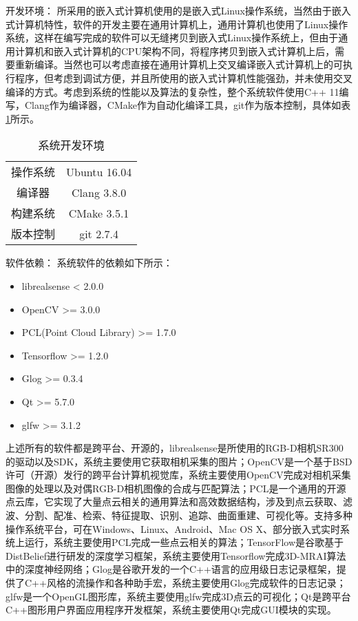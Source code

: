{\kai 开发环境：}
所采用的嵌入式计算机使用的是嵌入式Linux操作系统，当然由于嵌入式计算机特性，软件的开发主要在通用计算机上，通用计算机也使用了Linux操作系统，这样在编写完成的软件可以无缝拷贝到嵌入式Linux操作系统上，但由于通用计算机和嵌入式计算机的CPU架构不同，将程序拷贝到嵌入式计算机上后，需要重新编译。当然也可以考虑直接在通用计算机上交叉编译嵌入式计算机上的可执行程序，但考虑到调试方便，并且所使用的嵌入式计算机性能强劲，并未使用交叉编译的方式。考虑到系统的性能以及算法的复杂性，整个系统软件使用C++ 11编写，Clang作为编译器，CMake作为自动化编译工具，git作为版本控制，具体如表\ref{tab:dev_env}所示。
\begin{table}[ht]
  \centering
  \caption{系统开发环境}
  \begin{tabular}{cc}
    \toprule
    操作系统&Ubuntu 16.04\\
    编译器&Clang 3.8.0 \\
    构建系统&CMake 3.5.1 \\
    版本控制& git 2.7.4 \\
    \bottomrule
  \end{tabular}
  \label{tab:dev_env}
\end{table}

{\kai 软件依赖：}
系统软件的依赖如下所示：
\begin{itemize}
\item librealsense < 2.0.0
\item OpenCV >= 3.0.0
\item PCL(Point Cloud Library) >= 1.7.0
\item Tensorflow >= 1.2.0
\item Glog >= 0.3.4
\item Qt >= 5.7.0
\item glfw >= 3.1.2
\end{itemize}
上述所有的软件都是跨平台、开源的，librealsense是所使用的RGB-D相机SR300的驱动以及SDK，系统主要使用它获取相机采集的图片；OpenCV是一个基于BSD许可（开源）发行的跨平台计算机视觉库，系统主要使用OpenCV完成对相机采集图像的处理以及对偶RGB-D相机图像的合成与匹配算法；PCL是一个通用的开源点云库，它实现了大量点云相关的通用算法和高效数据结构，涉及到点云获取、滤波、分割、配准、检索、特征提取、识别、追踪、曲面重建、可视化等。支持多种操作系统平台，可在Windows、Linux、Android、Mac OS X、部分嵌入式实时系统上运行，系统主要使用PCL完成一些点云相关的算法；TensorFlow是谷歌基于DistBelief进行研发的深度学习框架，系统主要使用Tensorflow完成3D-MRAI算法中的深度神经网络；Glog是谷歌开发的一个C++语言的应用级日志记录框架，提供了C++风格的流操作和各种助手宏，系统主要使用Glog完成软件的日志记录；glfw是一个OpenGL图形库，系统主要使用glfw完成3D点云的可视化；Qt是跨平台C++图形用户界面应用程序开发框架，系统主要使用Qt完成GUI模块的实现。

